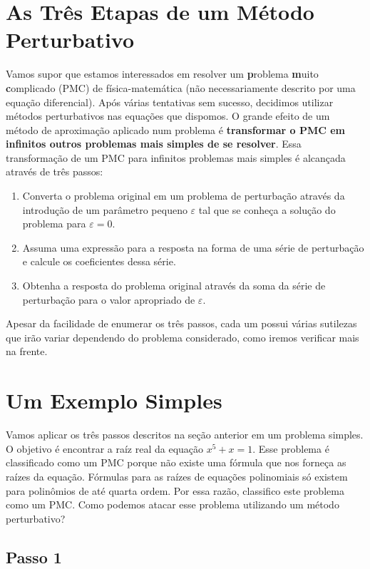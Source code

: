 \documentclass{article}
\begin{document}
\section{As Três Etapas de um Método Perturbativo}

Vamos supor que estamos interessados em resolver um \textbf{p}roblema \textbf{m}uito \textbf{c}omplicado (PMC) de física-matemática (não necessariamente descrito por uma equação diferencial). Após várias tentativas sem sucesso, decidimos utilizar métodos perturbativos nas equações que dispomos. O grande efeito de um método de aproximação aplicado num problema é \textbf{transformar o PMC em infinitos outros problemas mais simples de se resolver}. Essa transformação de um PMC para infinitos problemas mais simples é alcançada através de três passos:
\begin{enumerate}
    \item Converta o problema original em um problema de perturbação através da introdução de um parâmetro pequeno $\varepsilon$ tal que se conheça a solução do problema para $\varepsilon= 0$.
    \item Assuma uma expressão para a resposta na forma de uma série de perturbação e calcule os coeficientes dessa série.
    \item Obtenha a resposta do problema original através da soma da série de perturbação para o valor apropriado de $\varepsilon$.
\end{enumerate}
Apesar da facilidade de enumerar os três passos, cada um possui várias sutilezas que irão variar dependendo do problema considerado, como iremos verificar mais na frente.




\section{Um Exemplo Simples}

Vamos aplicar os três passos descritos na seção anterior em um problema simples. O objetivo é encontrar a raíz real da equação $x^5 + x = 1$. Esse problema é classificado como um PMC porque não existe uma fórmula que nos forneça as raízes da equação. Fórmulas para as raízes de equações polinomiais só existem para polinômios de até quarta ordem. Por essa razão, classifico este problema como um PMC. Como podemos atacar esse problema utilizando um método perturbativo? 

\subsection{Passo 1}
\end{document}
